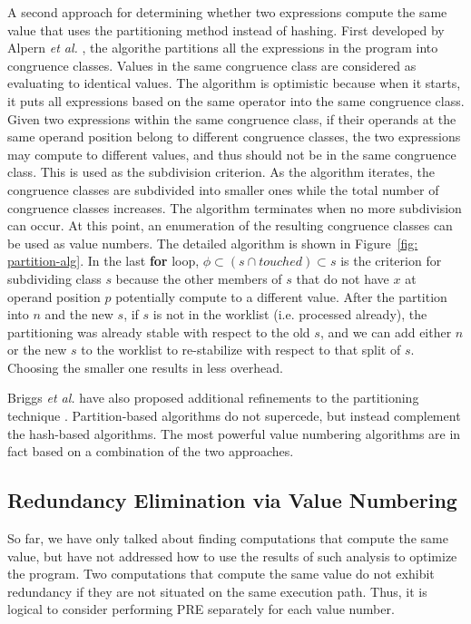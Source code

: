 A second approach for determining whether two expressions compute the
same value that uses the partitioning method instead of hashing. 
First developed by
Alpern {\it et al.} \cite{AWZ88}, the algorithe partitions all the expressions
in the program into congruence classes.  Values in the same congruence class 
are considered as evaluating to identical values.  The algorithm is 
optimistic because when it starts,
it puts all expressions based on the same operator into the same
congruence class.  Given two expressions within the same congruence class, if 
their operands at the same operand position belong to different congruence
classes, the two expressions may compute to different values, and thus should
not be in the same congruence class.  This is used as the subdivision 
criterion.  As the algorithm iterates, the congruence classes are subdivided
into smaller ones while the total number of congruence classes increases.
The algorithm terminates when no more subdivision can occur.
At this point, an enumeration of the resulting congruence classes can be
used as value numbers.  The detailed algorithm is shown in 
Figure~\ref{fig: partition-alg}. In the last {\bf for} loop, 
$\phi \subset (s \cap touched) \subset s$ is the criterion for subdividing
class $s$ because the other members of $s$ that do not have $x$ at
operand position $p$ potentially compute to a different value.  
After the partition into $n$ and the new $s$,
if $s$ is not in the worklist (i.e. processed already), the 
partitioning was already stable with respect to the old $s$, and
we can add either $n$ or the new $s$ to the worklist to re-stabilize with
respect to that split of $s$.  Choosing the smaller one results in less
overhead.

Briggs {\it et al.} have also proposed additional refinements to the 
partitioning technique \cite{Briggs97}.  
Partition-based algorithms do not supercede, but 
instead complement the hash-based algorithms.
The most powerful value numbering algorithms are in fact based on
a combination of the two approaches.

\subsection{Redundancy Elimination via Value Numbering}

So far, we have only talked about finding computations that compute the
same value, but have not addressed how to use the results of such analysis 
to optimize the program.  Two computations that compute the same value do
not exhibit redundancy if they are not situated on the same
execution path.  Thus, it is logical to consider performing PRE separately
for each value number.  

